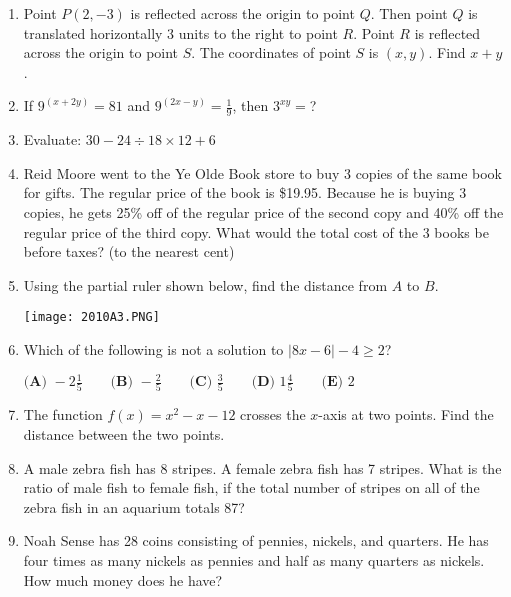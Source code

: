 \documentclass[../uilmath.tex]{subfiles}
\begin{document}
\begin{enumerate}[label=\bfseries\arabic*.]
        \item %
        Point $P(2,-3)$ is reflected across the origin to point $Q$. Then point $Q$ is translated horizontally 3 units to the right to point $R$.
        Point $R$ is reflected across the origin to point $S$. The coordinates of point $S$ is $(x,y)$. Find $x+y$.

        \item %
        If $9^{(x+2y)}=81$ and $9^{(2x-y)}=\frac{1}{9}$, then $3^{xy}=$?

        \item %
        Evaluate: $30-24\div 18\times 12+6$

        \item %
        Reid Moore went to the Ye Olde Book store to buy 3 copies of the same book for gifts. The regular price of the book is \$19.95.
        Because he is buying 3 copies, he gets 25\% off of the regular price of the second copy and 40\% off the regular price of the third copy.
        What would the total cost of the 3 books be before taxes? (to the nearest cent)

        \item %
        Using the partial ruler shown below, find the distance from $A$ to $B$.
        \begin{center}
            \texttt{[image: 2010A3.PNG]}
        \end{center}

        \item %
        Which of the following is not a solution to $|8x-6|-4\geq 2$?

        $\textbf{(A) } -2\frac{1}{5} \qquad \textbf{(B) } -\frac{2}{5} \qquad \textbf{(C) } \frac{3}{5} \qquad \textbf{(D) } 1\frac{4}{5} \qquad \textbf{(E) } 2$

        \item %
        The function $f(x)=x^2-x-12$ crosses the $x$-axis at two points. Find the distance between the two points.

        \item %
        A male zebra fish has 8 stripes. A female zebra fish has 7 stripes. What is the ratio of male fish to female fish, if the 
        total number of stripes on all of the zebra fish in an aquarium totals 87?

        \item %
        Noah Sense has 28 coins consisting of pennies, nickels, and quarters. He has four times as many nickels as pennies and half as many quarters as nickels. How much money does he have?


\end{enumerate}
\end{document}
